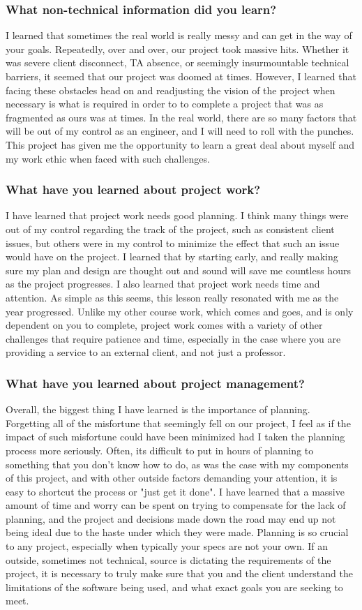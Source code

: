 \documentclass[onecolumn, draftclsnofoot,10pt, compsoc]{IEEEtran}
\begin{document}
\subsubsection{What non-technical information did you learn?}
I learned that sometimes the real world is really messy and can get in the way of your goals. Repeatedly, over and over, our project took massive hits. Whether it was severe client disconnect, TA absence, or seemingly insurmountable technical barriers, it seemed that our project was doomed at times. However, I learned that facing these obstacles head on and readjusting the vision of the project when necessary is what is required in order to to complete a project that was as fragmented as ours was at times. In the real world, there are so many factors that will be out of my control as an engineer, and I will need to roll with the punches. This project has given me the opportunity to learn a great deal about myself and my work ethic when faced with such challenges.
\subsubsection{What have you learned about project work?}
I have learned that project work needs good planning. I think many things were out of my control regarding the track of the project, such as consistent client issues, but others were in my control to minimize the effect that such an issue would have on the project. I learned that by starting early, and really making sure my plan and design are thought out and sound will save me countless hours as the project progresses. I also learned that project work needs time and attention. As simple as this seems, this lesson really resonated with me as the year progressed. Unlike my other course work, which comes and goes, and is only dependent on you to complete, project work comes with a variety of other challenges that require patience and time, especially in the case where you are providing a service to an external client, and not just a professor.
\subsubsection{What have you learned about project management?}
Overall, the biggest thing I have learned is the importance of planning. Forgetting all of the misfortune that seemingly fell on our project, I feel as if the impact of such misfortune could have been minimized had I taken the planning process more seriously. Often, its difficult to put in hours of planning to something that you don't know how to do, as was the case with my components of this project, and with other outside factors demanding your attention, it is easy to shortcut the process or "just get it done". I have learned that a massive amount of time and worry can be spent on trying to compensate for the lack of planning, and the project and decisions made down the road may end up not being ideal due to the haste under which they were made. Planning is so crucial to any project, especially when typically your specs are not your own. If an outside, sometimes not technical, source is dictating the requirements of the project, it is necessary to truly make sure that you and the client understand the limitations of the software being used, and what exact goals you are seeking to meet.
\end{document}
